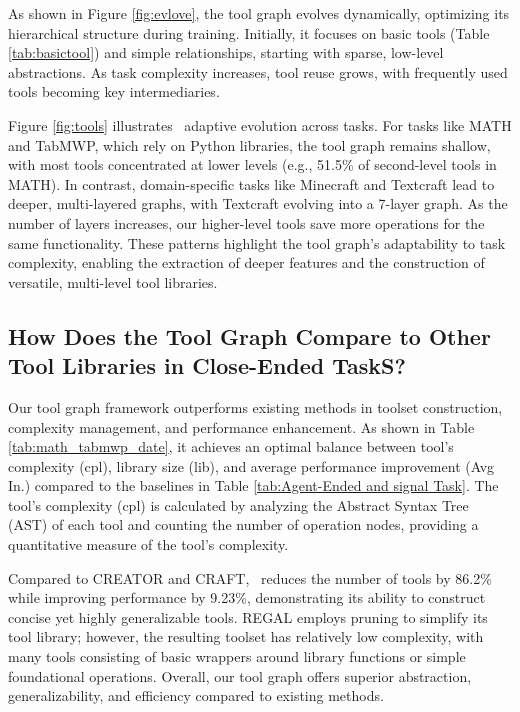 As shown in Figure \ref{fig:evlove}, the tool graph evolves dynamically, optimizing its hierarchical structure during training. Initially, it focuses on basic tools (Table \ref{tab:basictool}) and simple relationships, starting with sparse, low-level abstractions. As task complexity increases, tool reuse grows, with frequently used tools becoming key intermediaries.

Figure \ref{fig:tools} illustrates \ours\ adaptive evolution across tasks. For tasks like MATH and TabMWP, which rely on Python libraries, the tool graph remains shallow, with most tools concentrated at lower levels (e.g., 51.5\% of second-level tools in MATH). In contrast, domain-specific tasks like Minecraft and Textcraft lead to deeper, multi-layered graphs, with Textcraft evolving into a 7-layer graph. As the number of layers increases, our higher-level tools save more operations for the same functionality. These patterns highlight the tool graph’s adaptability to task complexity, enabling the extraction of deeper features and the construction of versatile, multi-level tool libraries.


\subsection{How Does the Tool Graph Compare to Other Tool Libraries in Close-Ended TaskS?}
\label{subsec:compare}
% 
Our tool graph framework outperforms existing methods in toolset construction, complexity management, and performance enhancement.  As shown in Table \ref{tab:math_tabmwp_date}, it achieves an optimal balance between tool's complexity (cpl), library size (lib), and average performance improvement (Avg In.) compared to the baselines in Table \ref{tab:Agent-Ended and signal Task}. The tool's complexity (cpl) is calculated by analyzing the Abstract Syntax Tree (AST) of each tool and counting the number of operation nodes, providing a quantitative measure of the tool's complexity. 
\vspace{-1pt}


Compared to CREATOR and CRAFT, \ours\ reduces the number of tools by 86.2\% while improving performance by 9.23\%, demonstrating its ability to construct concise yet highly generalizable tools. REGAL employs pruning to simplify its tool library; however, the resulting toolset has relatively low complexity, with many tools consisting of basic wrappers around library functions or simple foundational operations. Overall, our tool graph offers superior abstraction, generalizability, and efficiency compared to existing methods.
